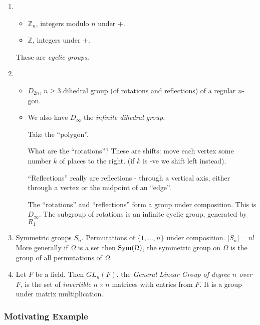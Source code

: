 \documentclass{article}
\theoremstyle{definition} \newtheorem*{definition}{Definition}
\begin{document}
\begin{exmps}\hfill \begin{enumerate} \item \begin{itemize} \item
            $\mathbb{Z}_n$, integers modulo $n$ under $+$.  \item $\mathbb{Z}$,
            integers under $+$.  \end{itemize} These are \emph{cyclic groups}.
      \item \begin{itemize} \item $D_{2n}$, $n \geq 3$ dihedral group (of
            rotations and reflections) of a regular $n$-gon.  \item We also
              have $D_\infty$ the \emph{infinite dihedral group}.

Take the ``polygon''.

What are the ``rotations''? These are shifts: move each vertex some number $k$
of places to the right. (if $k$ is -ve we shift left instead). 

``Reflections'' really are reflections - through a vertical axis, either
through a vertex or the midpoint of an ``edge''.

The ``rotations'' and ``reflections'' form a group under composition. This is
$D_\infty$. The subgroup of rotations is an infinite cyclic group, generated by
$R_1$

\end{itemize} \item Symmetric groups $S_n$. Permutations of $\{1, \ldots, n\}$
  under composition. $|S_n| = n!$ More generally if $\Omega$ is a set then
  $\operatorname{Sym}(\Omega)$, the symmetric group on $\Omega$ is the group of all
  permutations of $\Omega$.

\item Let $F$ be a field. Then $GL_n(F)$, the \emph{General Linear Group of
  degree $n$ over $F$}, is the set of \emph{invertible} $n \times n$ matrices
  with entries from $F$. It is a group under matrix multiplication.
  \end{enumerate}
  
\end{exmps}

\subsubsection*{Motivating Example}
\end{document}
